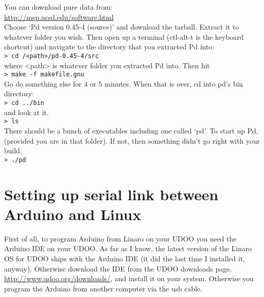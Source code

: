 \documentclass{article}
\begin{document}
You can download pure data from:\\

\url{http://msp.ucsd.edu/software.html}\\ 

Choose `Pd version 0.45-4 (source)' and download the tarball. Extract it to whatever folder you wish. Then open up a terminal (ctl-alt-t is the keyboard shortcut) and navigate to the directory that you extracted Pd into:\\

\texttt{\textgreater{} cd /\textless{}path\textgreater{}/pd-0.45-4/src}\\

where \textless{}path\textgreater{} is whatever folder you extracted Pd into. Then hit\\

\texttt{\textgreater{} make -f makefile.gnu}\\

Go do something else for 4 or 5 minutes. When that is over, cd into pd's bin directory:\\

\texttt{\textgreater{} cd ../bin}\\

and look at it.\\

\texttt{\textgreater{} ls}\\

There should be a bunch of executables including one called `pd'. To start up Pd, (provided you are in that folder). If not, then something didn't go right with your build.\\

\texttt{\textgreater{} ./pd}\\

\section{Setting up serial link between Arduino and Linux}
First of all, to program Arduino from Linaro on your UDOO you need the Arduino IDE on your UDOO. As far as I know, the latest version of the Linaro OS for UDOO ships with the Arduino IDE (it did  the last time I installed it, anyway). Otherwise download the IDE from the UDOO downloads page, \url{http://www.udoo.org/downloads/}, and install it on your system. Otherwise you program the Arduino from another computer via the usb cable. \\
\end{document}

